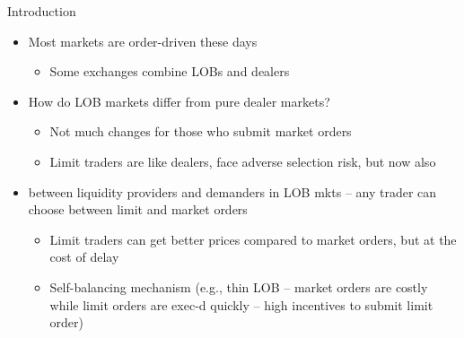 \documentclass[english,10pt]{beamer}
\begin{document}
\begin{frame}{Introduction}
	\begin{itemize}
		\item Most markets are order-driven these days
		\begin{itemize}
			\item Some exchanges combine LOBs and dealers
		\end{itemize}
		\item How do \alert{LOB markets} differ from pure \alert{dealer markets}?
		\begin{itemize}
			\item Not much changes for those who submit market orders
			\item Limit traders are like dealers, face adverse selection risk, but now also 
		\end{itemize}
		\item {} between liquidity providers and demanders in LOB mkts -- any trader can choose between limit and market orders
		\begin{itemize}
			\item Limit traders can get better prices compared to market orders, but at the cost of delay
			\item Self-balancing mechanism (e.g., thin LOB -- market orders are costly while limit orders are exec-d quickly -- high incentives to submit limit order)
		\end{itemize}
	\end{itemize}
\end{frame}
\end{document}
